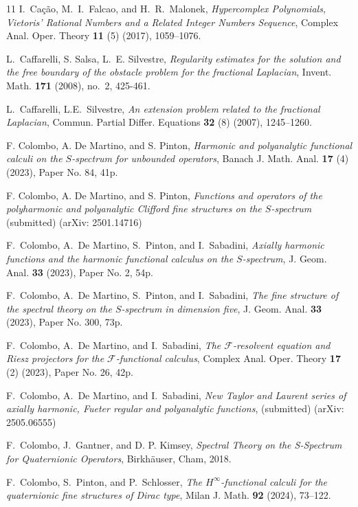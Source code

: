 \documentclass[reqno,11pt]{amsart}
\theoremstyle{definition}
\begin{document}
\begin{thebibliography}{11}
I.~Cação, M.~I.~Falcao, and H.~R.~Malonek,
\textit{Hypercomplex Polynomials, Vietoris' Rational Numbers and a Related Integer Numbers Sequence},
Complex Anal. Oper. Theory \textbf{11} (5) (2017), 1059--1076.

L.~Caffarelli, S. Salsa, L.~E. Silvestre, \textit{Regularity estimates for the solution and the free boundary of the obstacle problem for the fractional Laplacian}, Invent. Math. {\bf 171} (2008), no.~2, 425-461.

L.~Caffarelli, L.E.~Silvestre,
\textit{An extension problem related to the fractional {Laplacian}},
Commun. Partial Differ. Equations \textbf{32} (8) (2007), 1245--1260.



F. Colombo, A. De Martino, and S. Pinton,
\textit{Harmonic and polyanalytic functional calculi on the $S$-spectrum for unbounded operators},
Banach J. Math. Anal. \textbf{17} (4) (2023), Paper No. 84, 41p.


F. Colombo, A. De Martino, and S. Pinton,
\textit{Functions and operators of the polyharmonic and polyanalytic Clifford fine structures on the  $S$-spectrum}
(submitted) (arXiv: 2501.14716)


F.~Colombo, A.~De Martino, S.~Pinton, and I.~Sabadini,
\textit{Axially harmonic functions and the harmonic functional calculus on the $S$-spectrum},
J. Geom. Anal. \textbf{33} (2023), Paper No. 2, 54p.


F.~Colombo, A.~De Martino, S.~Pinton, and I.~Sabadini,
\textit{The fine structure of the spectral theory on the $S$-spectrum in dimension five},
J. Geom. Anal. \textbf{33} (2023), Paper No. 300, 73p.


	

F.~Colombo, A.~De Martino, and I.~Sabadini,
\textit{The $\mathcal{F}$-resolvent equation and Riesz projectors for the  $\mathcal{F}$-functional calculus},
Complex Anal. Oper. Theory \textbf{17} (2) (2023), Paper No. 26, 42p.
	
	
F.~Colombo, A.~De Martino, and I.~Sabadini,
\textit{New Taylor and Laurent series of axially harmonic, Fueter regular and polyanalytic functions},
(submitted) (arXiv: 2505.06555)
	

F.~Colombo, J.~Gantner, and D. P. Kimsey,
\textit{Spectral Theory on the {S}-Spectrum for Quaternionic Operators}, Birkh\"{a}user, Cham, 2018.


F.~Colombo, S.~Pinton, and P.~Schlosser,
\textit{The $H^{\infty}$-functional calculi for the quaternionic fine structures of Dirac type},
Milan J. Math. \textbf{92} (2024), 73--122.





\end{thebibliography}
\end{document}
